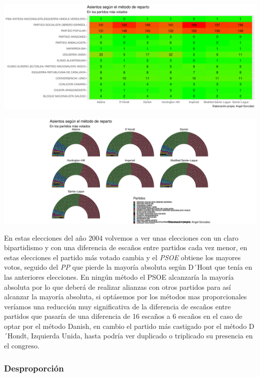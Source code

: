 \documentclass[12pt,a4paper,]{book}
\numberwithin{dummy}{section}
\theoremstyle{ocrenumbox}
\theoremstyle{blacknumex}
\theoremstyle{blacknumbox}
\theoremstyle{ocrenum}
\theoremstyle{ocrenum}
\begin{document}
\begin{center}\includegraphics[width=0.95\linewidth]{figurasR/unnamed-chunk-131-2} \end{center}

\begin{center}\includegraphics[width=0.95\linewidth]{figurasR/unnamed-chunk-131-3} \end{center}

En estas elecciones del año 2004 volvemos a ver unas elecciones con un
claro bipartidismo y con una diferencia de escaños entre partidos cada
vez menor, en estas elecciones el partido más votado cambia y el
\emph{PSOE} obtiene los mayores votos, seguido del \emph{PP} que pierde
la mayoría absoluta según D´Hont que tenía en las anteriores elecciones.
En ningún método el PSOE alcanzaría la mayoría absoluta por lo que
deberá de realizar alianzas con otros partidos para así alcanzar la
mayoría absoluta, si optásemos por los métodos mas proporcionales
veríamos una reducción muy significativa de la diferencia de escaños
entre partidos que pasaría de una diferencia de 16 escaños a 6 escaños
en el caso de optar por el método Danish, en cambio el partido más
castigado por el método D´Hondt, Izquierda Unida, hasta podría ver
duplicado o triplicado su presencia en el congreso.

\hypertarget{desproporciuxf3n-8}{%
\subsubsection{Desproporción}\label{desproporciuxf3n-8}}
\end{document}
